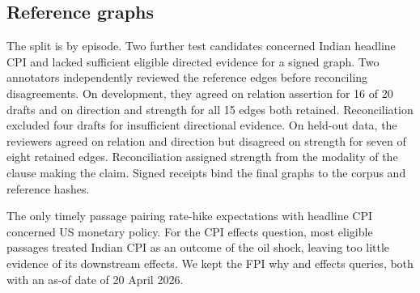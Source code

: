 \documentclass[11pt,a4paper]{article}
\newcommand{\runninglabel}{}
\newcommand{\reportpage}[1]{\newpage\renewcommand{\runninglabel}{#1}}
\begin{document}
\reportpage{Reference Graphs and Methodology}

\subsection{Reference graphs}\label{reference-graphs}

The split is by episode. Two further test candidates concerned Indian
headline CPI and lacked sufficient eligible directed evidence for a
signed graph. Two annotators independently reviewed the reference edges
before reconciling disagreements. On development, they agreed on
relation assertion for 16 of 20 drafts and on direction and strength for
all 15 edges both retained. Reconciliation excluded four drafts for
insufficient directional evidence. On held-out data, the reviewers
agreed on relation and direction but disagreed on strength for seven of
eight retained edges. Reconciliation assigned strength from the modality
of the clause making the claim. Signed receipts bind the final graphs to
the corpus and reference hashes.

The only timely passage pairing rate-hike expectations with headline CPI
concerned US monetary policy. For the CPI effects question, most
eligible passages treated Indian CPI as an outcome of the oil shock,
leaving too little evidence of its downstream effects. We kept the FPI
why and effects queries, both with an as-of date of 20 April 2026.
\end{document}
